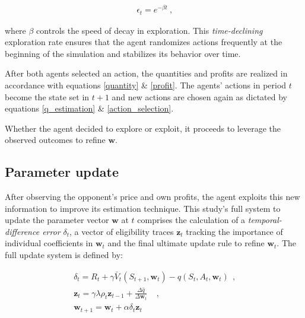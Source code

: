 \begin{gather}
	\epsilon_t = e^{-\beta t}~ \text{,}
\end{gather}

where $\beta$ controls the speed of decay in exploration. This \emph{time-declining} exploration rate ensures that the agent randomizes actions frequently at the beginning of the simulation and stabilizes its behavior over time. 

After both agents selected an action, the quantities and profits are realized in accordance with equations \ref{quantity} \& \ref{profit}. The agents' actions in period $t$ become the state set in $t+1$ and new actions are chosen again as dictated by equations \ref{q_estimation} \& \ref{action_selection}.

Whether the agent decided to explore or exploit, it proceeds to leverage the observed outcomes to refine $\boldsymbol{w}$.

\subsection{Parameter update}\label{parameter_update}

After observing the opponent's price and own profits, the agent exploits this new information to improve its estimation technique. This study's full system to update the parameter vector $\boldsymbol{w}$ at $t$ comprises the calculation of a \emph{temporal-difference error} $\delta_t$, a vector of eligibility traces $\boldsymbol{z}_t$ tracking the importance of individual coefficients in $\boldsymbol{w}_t$ and the final ultimate update rule to refine $\boldsymbol{w}_t$. The full update system is defined by:

\begin{gather}
\delta_t = R_t + \gamma \bar{V}_t(S_{t+1}, \boldsymbol{w}_t) - \hat{q}(S_t, A_t, \boldsymbol{w}_t) ~~ \text{,} \label{td_error_expected} \\
\boldsymbol{z}_{t} = 
\gamma \lambda \rho_t \boldsymbol{z}_{t-1} + \frac{\Delta \hat{q}}{\Delta \boldsymbol{w}_t} ~~~~~ \text{,} \label{eligibility_trace_update} \\
\boldsymbol{w}_{t+1} = \boldsymbol{w}_t + \alpha \delta_t	\boldsymbol{z}_t \label{update_rule}
\end{gather}

